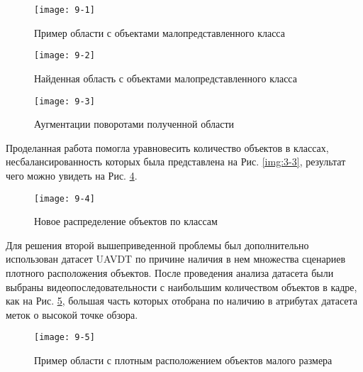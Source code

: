 \begin{figure}[ht]
    \centering
    \texttt{[image: 9-1]}
    \caption{Пример области с объектами малопредставленного класса}
    \label{img:9-1}
\end{figure}

\begin{figure}[ht]
    \centering
    \texttt{[image: 9-2]}
    \caption{Найденная область с объектами малопредставленного класса}
    \label{img:9-2}
\end{figure}

\begin{figure}[ht]
    \centering
    \texttt{[image: 9-3]}
    \caption{Аугментации поворотами полученной области}
    \label{img:9-3}
\end{figure}

Проделанная работа помогла уравновесить количество объектов в классах, несбалансированность которых была представлена на Рис. \ref{img:3-3}, результат чего можно увидеть на Рис. \ref{img:9-4}.

\begin{figure}[ht]
    \centering
    \texttt{[image: 9-4]}
    \caption{Новое распределение объектов по классам}
    \label{img:9-4}
\end{figure}

Для решения второй вышеприведенной проблемы был дополнительно использован датасет UAVDT по причине наличия в нем множества сценариев плотного расположения объектов. После проведения анализа датасета были выбраны видеопоследовательности с наибольшим количеством объектов в кадре, как на Рис. \ref{img:9-5}, большая часть которых отобрана по наличию в атрибутах датасета меток о высокой точке обзора. 

\vspace{0.5cm}

\begin{figure}[ht]
    \centering
    \texttt{[image: 9-5]}
    \caption{Пример области с плотным расположением объектов малого размера}
    \label{img:9-5}
\end{figure}
